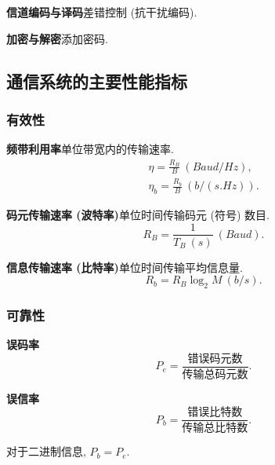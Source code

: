 \textbf{信道编码与译码}\quad 差错控制 (抗干扰编码).

\textbf{加密与解密}\quad 添加密码.

\subsection{通信系统的主要性能指标}
\subsubsection{有效性}
\textbf{频带利用率}\quad 单位带宽内的传输速率.
\begin{gather}
    \eta=\frac{R_B}{B}\ (\unit{Baud/Hz}), \\
    \eta_b=\frac{R_b}{B}\ (\unit{b/(s.Hz)}).
\end{gather}

\textbf{码元传输速率 (波特率)}\quad 单位时间传输码元 (符号) 数目.
\begin{equation}
    R_B=\frac{1}{T_B\ (\unit{s})}\ (\unit{Baud}).
\end{equation}

\textbf{信息传输速率 (比特率)}\quad 单位时间传输平均信息量.
\begin{equation}
    R_b=R_B\log_2M\ (\unit{b/s}).
\end{equation}

\subsubsection{可靠性}
\textbf{误码率}
\begin{equation}
    P_e=\frac{\textrm{错误码元数}}{\textrm{传输总码元数}}.
\end{equation}

\textbf{误信率}
\begin{equation}
    P_b=\frac{\textrm{错误比特数}}{\textrm{传输总比特数}}.
\end{equation}

对于二进制信息, $P_b=P_e$.
